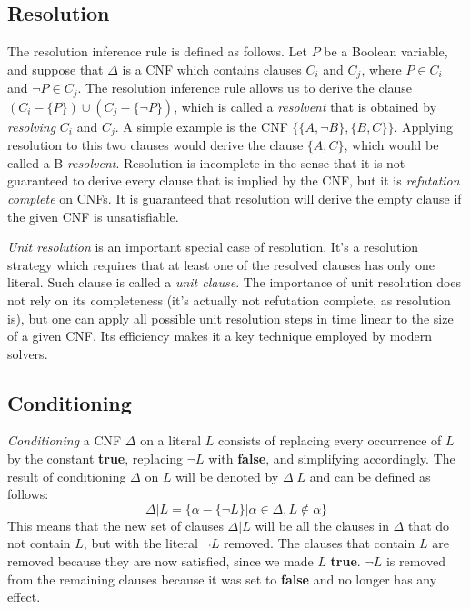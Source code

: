 \documentclass[12pt]{diicc}
\begin{document}
\subsection{Resolution}
The resolution inference rule \cite{Rob65} is defined as follows. Let $P$ be a Boolean variable, and suppose that $\Delta$ is a CNF which contains clauses $C_{i}$ and $C_{j}$, where $P \in C_{i}$ and $\neg P \in C_{j}$. The resolution inference rule allows us to derive the clause $(C_{i}-\{P\})\cup (C_{j}-\{\neg P\})$, which is called a \textit{resolvent} that is obtained by \textit{resolving} $C_{i}$ and $C_{j}$. A simple example is the CNF $\{\{A,\neg B\},\{B,C\}\}$. Applying resolution to this two clauses would derive the clause $\{A,C\}$, which would be called a B-\textit{resolvent}.
Resolution is incomplete in the sense that it is not guaranteed to derive every clause that is implied by the CNF, but it is \textit{refutation complete} on CNFs. It is guaranteed that resolution will derive the empty clause if the given CNF is unsatisfiable. 

\textit{Unit resolution} is an important special case of resolution. It's a resolution strategy which requires that at least one of the resolved clauses has only one literal. Such clause is called a \textit{unit clause}. The importance of unit resolution does not rely on its completeness (it's actually not refutation complete, as resolution is), but one can apply all possible unit resolution steps in time linear to the size of a given CNF. Its efficiency makes it a key technique employed by modern solvers.

\subsection{Conditioning}
\textit{Conditioning} a CNF $\Delta$ on a literal $L$ consists of replacing every occurrence of $L$ by the constant \textbf{true}, replacing $\neg L$ with \textbf{false}, and simplifying accordingly. The result of conditioning $\Delta$ on $L$ will be denoted by $\Delta |L$ and can be defined as follows:
\[ \Delta |L=\{\alpha -\{\neg L\}|\alpha \in \Delta, L\notin \alpha\}\]
This means that the new set of clauses $\Delta |L$ will be all the clauses in $\Delta$ that do not contain $L$, but with the literal $\neg L$ removed. The clauses that contain $L$ are removed because they are now satisfied, since we made $L$ \textbf{true}. $\neg L$ is removed from the remaining clauses because it was set to \textbf{false} and no longer has any effect.
\end{document}
